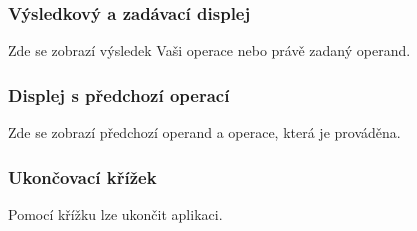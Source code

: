 \documentclass[a5paper,8pt,twoside]{extarticle}
\begin{document}
    \subsubsection{Výsledkový a zadávací displej}
    Zde se zobrazí výsledek Vaši operace nebo právě zadaný operand.

    \subsubsection{Displej s předchozí operací}
    Zde se zobrazí předchozí operand a operace, která je prováděna.

    \subsubsection{Ukončovací křížek}
    Pomocí křížku lze ukončit aplikaci.
\end{document}
